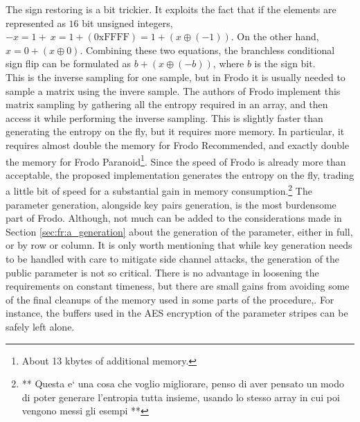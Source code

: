 The sign restoring is a bit trickier. It exploits the fact that if the elements are represented as $16$ bit unsigned integers, $-x=1+~x=1+(\text{0xFFFF})=1+(x\oplus(-1))$. On the other hand,$x=0+(x\oplus0)$. Combining these two equations, the branchless conditional sign flip can be formulated as $b+(x\oplus(-b))$, where $b$ is the sign bit.\\
This is the inverse sampling for one sample, but in Frodo it is usually needed to sample a matrix using the invere sample. The authors of Frodo implement this matrix sampling by gathering all the entropy required in an array, and then access it while performing the inverse sampling. This is slightly faster than generating the entropy on the fly, but it requires more memory. In particular, it requires almost double the memory for Frodo Recommended, and exactly double the memory for Frodo Paranoid\footnote{About 13 kbytes of additional memory.}. Since the speed of Frodo is already more than acceptable, the proposed implementation generates the entropy on the fly, trading a little bit of speed for a substantial gain in memory consumption.\footnote{** Questa e` una cosa che voglio migliorare, penso di aver pensato un modo di poter generare l'entropia tutta insieme, usando lo stesso array in cui poi vengono messi gli esempi **}
The parameter generation, alongside key pairs generation, is the most burdensome part of Frodo. Although, not much can be added to the considerations made in Section \ref{sec:fr:a_generation} about the generation of the parameter, either in full, or by row or column. It is only worth mentioning that while key generation needs to be handled with care to mitigate side channel attacks, the generation of the public parameter is not so critical. There is no advantage in loosening the requirements on constant timeness, but there are small gains from avoiding some of the final cleanups of the memory used in some parts of the procedure,. For instance, the buffers used in the AES encryption of the parameter stripes can be safely left alone.\\

